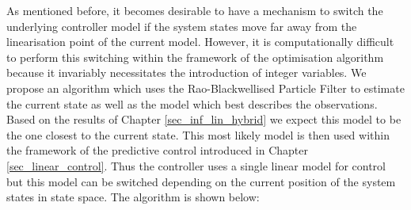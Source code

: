 As mentioned before, it becomes desirable to have a mechanism to switch the underlying controller model if the system states move far away from the linearisation point of the current model. However, it is computationally difficult to perform this switching within the framework of the optimisation algorithm because it invariably necessitates the introduction of integer variables. We propose an algorithm which uses the Rao-Blackwellised Particle Filter to estimate the current state as well as the model which best describes the observations. Based on the results of Chapter \ref{sec_inf_lin_hybrid} we expect this model to be the one closest to the current state. This most likely model is then used within the framework of the predictive control introduced in Chapter \ref{sec_linear_control}. Thus the controller uses a single linear model for control but this model can be switched depending on the current position of the system states in state space. The algorithm is shown below:

